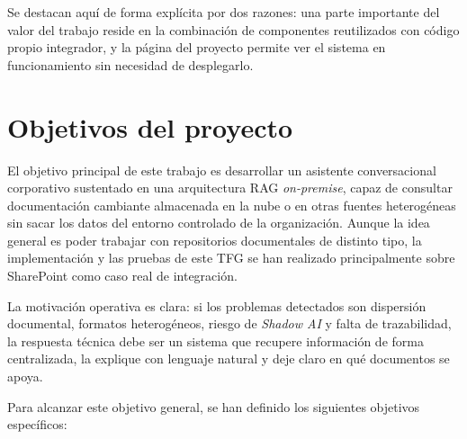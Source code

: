Se destacan aquí de forma explícita por dos razones: una parte importante del valor del trabajo reside en la combinación de componentes reutilizados con código propio integrador, y la página del proyecto permite ver el sistema en funcionamiento sin necesidad de desplegarlo.

\section{Objetivos del proyecto}
\label{sec:objetivos}

El objetivo principal de este trabajo es desarrollar un asistente conversacional corporativo sustentado en una arquitectura RAG \textit{on-premise}, capaz de consultar documentación cambiante almacenada en la nube o en otras fuentes heterogéneas sin sacar los datos del entorno controlado de la organización. Aunque la idea general es poder trabajar con repositorios documentales de distinto tipo, la implementación y las pruebas de este TFG se han realizado principalmente sobre SharePoint como caso real de integración.

La motivación operativa es clara: si los problemas detectados son dispersión documental, formatos heterogéneos, riesgo de \textit{Shadow AI} y falta de trazabilidad, la respuesta técnica debe ser un sistema que recupere información de forma centralizada, la explique con lenguaje natural y deje claro en qué documentos se apoya.

Para alcanzar este objetivo general, se han definido los siguientes objetivos específicos:


